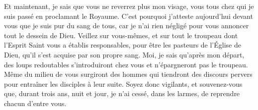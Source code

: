 Et maintenant, je sais que vous ne reverrez plus mon visage,
	vous tous chez qui je suis passé en proclamant le Royaume.
C’est pourquoi j’atteste aujourd’hui devant vous que je suis pur du sang de tous,
	car je n’ai rien négligé pour vous annoncer tout le dessein de Dieu.
Veillez sur vous-mêmes,
	et sur tout le troupeau dont l’Esprit Saint vous a établis responsables,
	pour être les pasteurs de l’Église de Dieu, qu’il s’est acquise par son propre sang.
Moi, je sais qu’après mon départ,
	des loups redoutables s’introduiront chez vous et n’épargneront pas le troupeau.
Même du milieu de vous surgiront des hommes qui tiendront des discours pervers
	pour entraîner les disciples à leur suite.
Soyez donc vigilants, et souvenez-vous que, durant trois ans, nuit et jour,
	je n’ai cessé, dans les larmes, de reprendre chacun d’entre vous.

